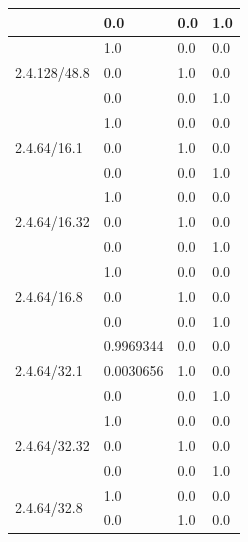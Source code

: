 \documentclass[12pt]{article}
\begin{document}
\begin{longtable}{llll}
                                                                            &  0.0 & 0.0 & 1.0 \\ \hline
\multirow{3}{*}{2.4.128/48.8}   &  1.0 & 0.0 & 0.0 \\
                                                                            &  0.0 & 1.0 & 0.0 \\
                                                                            &  0.0 & 0.0 & 1.0 \\ \hline
\multirow{3}{*}{2.4.64/16.1}   &  1.0 & 0.0 & 0.0 \\
                                                                            &  0.0 & 1.0 & 0.0 \\
                                                                            &  0.0 & 0.0 & 1.0 \\ \hline
\multirow{3}{*}{2.4.64/16.32}   &  1.0 & 0.0 & 0.0 \\
                                                                            &  0.0 & 1.0 & 0.0 \\
                                                                            &  0.0 & 0.0 & 1.0 \\ \hline
\multirow{3}{*}{2.4.64/16.8}   &  1.0 & 0.0 & 0.0 \\
                                                                            &  0.0 & 1.0 & 0.0 \\
                                                                            &  0.0 & 0.0 & 1.0 \\ \hline
\multirow{3}{*}{2.4.64/32.1}   &  0.9969344 & 0.0 & 0.0 \\
                                                                            &  0.0030656 & 1.0 & 0.0 \\
                                                                            &  0.0 & 0.0 & 1.0 \\ \hline
\multirow{3}{*}{2.4.64/32.32}   &  1.0 & 0.0 & 0.0 \\
                                                                            &  0.0 & 1.0 & 0.0 \\
                                                                            &  0.0 & 0.0 & 1.0 \\ \hline
\multirow{3}{*}{2.4.64/32.8}   &  1.0 & 0.0 & 0.0 \\
                                                                            &  0.0 & 1.0 & 0.0 \\

\end{longtable}
\end{document}
